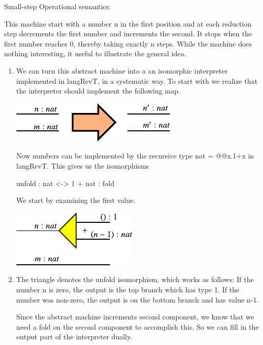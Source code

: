 \documentclass{llncs}
\begin{document}
Small-step Operational semantics:


This machine start with a number {{n}} in the first position and at
each reduction step decrements the first number and increments the
second. It stops when the first number reaches 0, thereby taking
exactly {{n}} steps. While the machine does nothing interesting,
it useful to illustrate the general idea.

\begin{enumerate}
\item 
We can turn this abstract machine into a an isomorphic interpreter
implemented in {{langRevT}}, in a systematic way. To start with we
realize that the interpreter should implement the following map.

\begin{center}
  \includegraphics{diagrams/nat-nat1.pdf}
\end{center}

Now numbers can be implemented by the recursive type {{nat = @@x.1+x}}
in {{langRevT}}. This gives us the isomorphisms 

\begin{center}
  {{unfold : nat <-> 1 + nat : fold}}
\end{center}

We start by examining the first value. 

\begin{center}
  \includegraphics{diagrams/nat-nat2.pdf}
\end{center}

\item
The triangle denotes the {{unfold}} isomorphism, which works as
follows: If the number {{n}} is zero, the output is the top branch
which has type {{1}}. If the number was non-zero, the output is on the
bottom branch and has value {{n-1}}. 

Since the abstract machine increments second component, we know that
we need a {{fold}} on the second component to accomplish this. So we
can fill in the output part of the interpreter dually. 


\end{enumerate}
\end{document}
